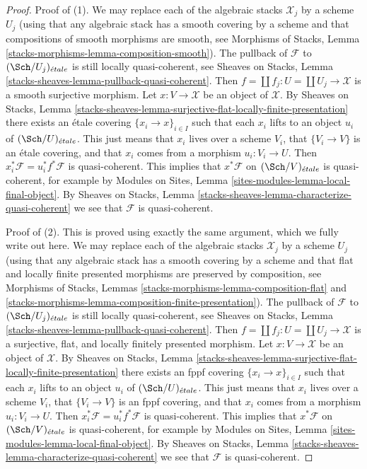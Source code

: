 \begin{proof}
Proof of (1). We may replace each of the algebraic stacks $\mathcal{X}_j$
by a scheme $U_j$ (using that any algebraic stack has a smooth covering by
a scheme and that compositions of smooth morphisms are smooth, see
Morphisms of Stacks, Lemma \ref{stacks-morphisms-lemma-composition-smooth}).
The pullback of $\mathcal{F}$ to $(\Sch/U_j)_{\acute{e}tale}$ is still
locally quasi-coherent, see
Sheaves on Stacks, Lemma \ref{stacks-sheaves-lemma-pullback-quasi-coherent}.
Then $f = \coprod f_j : U = \coprod U_j \to \mathcal{X}$ is a smooth surjective
morphism. Let $x : V \to \mathcal{X}$ be an object of $\mathcal{X}$. By
Sheaves on Stacks, Lemma
\ref{stacks-sheaves-lemma-surjective-flat-locally-finite-presentation}
there exists an \'etale covering $\{x_i \to x\}_{i \in I}$
such that each $x_i$ lifts to an object $u_i$ of $(\Sch/U)_{\acute{e}tale}$.
This just means that $x_i$ lives over a scheme $V_i$, that
$\{V_i \to V\}$ is an \'etale covering, and that $x_i$ comes from
a morphism $u_i : V_i \to U$. Then
$x_i^*\mathcal{F} = u_i^*f^*\mathcal{F}$ is quasi-coherent.
This implies that $x^*\mathcal{F}$ on $(\Sch/V)_{\acute{e}tale}$
is quasi-coherent, for example by
Modules on Sites, Lemma \ref{sites-modules-lemma-local-final-object}.
By Sheaves on Stacks, Lemma
\ref{stacks-sheaves-lemma-characterize-quasi-coherent}
we see that $\mathcal{F}$ is quasi-coherent.

\medskip\noindent
Proof of (2). This is proved using exactly the same argument, which we fully
write out here. We may replace each of the algebraic stacks $\mathcal{X}_j$
by a scheme $U_j$ (using that any algebraic stack has a smooth covering by
a scheme and that flat and locally finite presented morphisms are preserved
by composition, see Morphisms of Stacks, Lemmas
\ref{stacks-morphisms-lemma-composition-flat} and
\ref{stacks-morphisms-lemma-composition-finite-presentation}).
The pullback of $\mathcal{F}$ to $(\Sch/U_j)_{\acute{e}tale}$ is still
locally quasi-coherent, see
Sheaves on Stacks, Lemma \ref{stacks-sheaves-lemma-pullback-quasi-coherent}.
Then $f = \coprod f_j : U = \coprod U_j \to \mathcal{X}$ is a surjective,
flat, and locally finitely presented morphism. Let
$x : V \to \mathcal{X}$ be an object of $\mathcal{X}$. By
Sheaves on Stacks, Lemma
\ref{stacks-sheaves-lemma-surjective-flat-locally-finite-presentation}
there exists an fppf covering $\{x_i \to x\}_{i \in I}$
such that each $x_i$ lifts to an object $u_i$ of $(\Sch/U)_{\acute{e}tale}$.
This just means that $x_i$ lives over a scheme $V_i$, that
$\{V_i \to V\}$ is an fppf covering, and that $x_i$ comes from
a morphism $u_i : V_i \to U$. Then
$x_i^*\mathcal{F} = u_i^*f^*\mathcal{F}$ is quasi-coherent.
This implies that $x^*\mathcal{F}$ on $(\Sch/V)_{\acute{e}tale}$
is quasi-coherent, for example by
Modules on Sites, Lemma \ref{sites-modules-lemma-local-final-object}.
By Sheaves on Stacks, Lemma
\ref{stacks-sheaves-lemma-characterize-quasi-coherent}
we see that $\mathcal{F}$ is quasi-coherent.
\end{proof}

